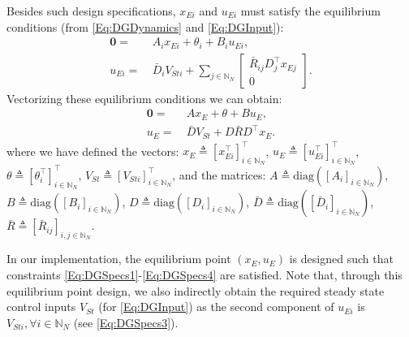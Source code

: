 \documentclass[letterpaper, 10 pt, conference]{ieeeconf}%
\newcommand{\N}{\mathbb{N}}
\newcommand{\T}{\top}
\newcommand{\0}{\mathbf{0}}
\newcommand{\diag}{\text{diag}}
\newcommand{\bm}[1]{\begin{bmatrix}#1\end{bmatrix}}
\begin{document}
Besides such design specifications, $x_{Ei}$ and $u_{Ei}$ must satisfy the equilibrium conditions (from \eqref{Eq:DGDynamics} and \eqref{Eq:DGInput}):
\begin{equation}\label{Eq:DGSpecs3}
\begin{aligned}
\0 =&\ A_i x_{Ei} + \theta_i + B_i u_{Ei}, \\
u_{Ei} =&\ \bar{D}_i V_{Sti} + \sum_{j\in\N_N} \bm{\bar{R}_{ij}D_j^\T x_{Ej} \\ 0}.
\end{aligned}
\end{equation}
Vectorizing these equilibrium conditions we can obtain:
\begin{equation}\label{Eq:DGSpecs4}
\begin{aligned}
\0 =&\ A x_E + \theta + B u_E, \\
u_E =&\ \bar{D} V_{St} + D \bar{R} D^\T x_E.
\end{aligned}
\end{equation}
where we have defined the vectors:    
$x_E \triangleq [x_{Ei}^\T]_{i\in\N_N}^\T$, 
$u_E \triangleq [u_{Ei}^\T]_{i\in\N_N}^\T$, 
$\theta \triangleq [\theta_i^\T]_{i\in\N_N}^\T$, 
$V_{St} \triangleq [V_{Sti}]_{i\in\N_N}^\T$, 
and the matrices:
$A \triangleq \diag([A_i]_{i\in\N_N})$,
$B \triangleq \diag([B_i]_{i\in\N_N})$,
$D \triangleq \diag([D_i]_{i\in\N_N})$,
$\bar{D} \triangleq \diag([\bar{D}_i]_{i\in\N_N})$,
$\bar{R} \triangleq [\bar{R}_{ij}]_{i,j\in\N_N}$.

In our implementation, the equilibrium point $(x_E, u_E)$ is designed such that constraints \eqref{Eq:DGSpecs1}-\eqref{Eq:DGSpecs4} are satisfied. Note that, through this equilibrium point design, we also indirectly obtain the required steady state control inputs $V_{St}$ (for \eqref{Eq:DGInput}) as the second component of $u_{Ei}$ is $V_{Sti}, \forall i\in\N_N$ (see \eqref{Eq:DGSpecs3}).
\end{document}
